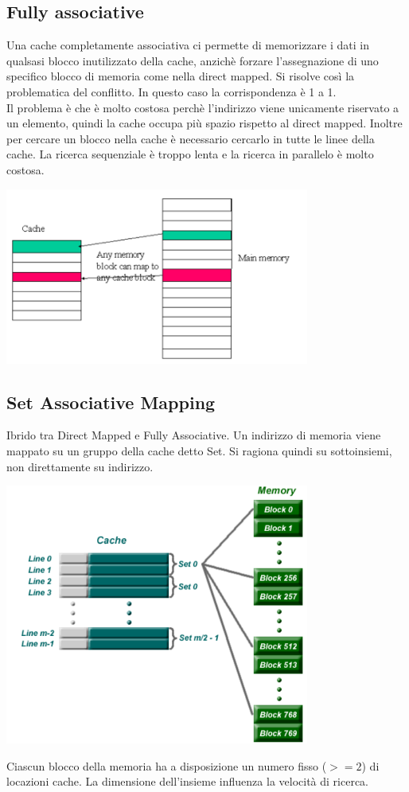 \documentclass[12pt, a4paper, openany]{book}
\begin{document}
\subsection*{Fully associative}
Una cache completamente associativa ci permette di memorizzare i dati in qualsasi blocco inutilizzato della cache,
anzichè forzare l'assegnazione di uno specifico blocco di memoria come nella direct mapped. Si risolve così la problematica
del conflitto. In questo caso la corrispondenza è 1 a 1.
\\ Il problema è che è molto costosa perchè l'indirizzo viene unicamente riservato a un elemento, quindi la cache occupa
più spazio rispetto al direct mapped. Inoltre per cercare un blocco nella cache è necessario cercarlo in tutte le linee
della cache. La ricerca sequenziale è troppo lenta e la ricerca in parallelo è molto costosa.
\begin{center}
    \includegraphics[width=100mm, scale=0.5]{Fully associative.png}
\end{center}

\subsection*{Set Associative Mapping}
Ibrido tra Direct Mapped e Fully Associative.
Un indirizzo di memoria viene mappato su un gruppo della cache detto Set. Si ragiona quindi su sottoinsiemi,
non direttamente su indirizzo.
\begin{center}
    \includegraphics[width=100mm, scale=0.5]{Set associative cache.png}
\end{center}
Ciascun blocco della memoria ha a disposizione un numero fisso ($>=2$) di locazioni cache.
La dimensione dell'insieme influenza la velocità di ricerca.
\end{document}
